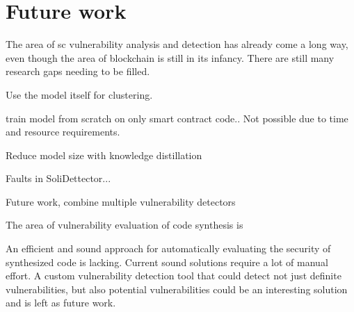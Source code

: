\chapter{Future work}
\label{chap:future-work}

The area of \acrshort{sc} vulnerability analysis and detection has already come a long way, even though the area of blockchain is still in its infancy. There are still many research gaps needing to be filled.


Use the model itself for clustering.

train model from scratch on only smart contract code.. Not possible  due to time and resource requirements.

Reduce model size with knowledge distillation

Faults in SoliDettector...

Future work, combine multiple vulnerability detectors

The area of vulnerability evaluation of code synthesis is 

An efficient and sound approach for automatically evaluating the security of synthesized code is lacking. Current sound solutions require a lot of manual effort. A custom vulnerability detection tool that could detect not just definite vulnerabilities, but also potential vulnerabilities could be an interesting solution and is left as future work.
